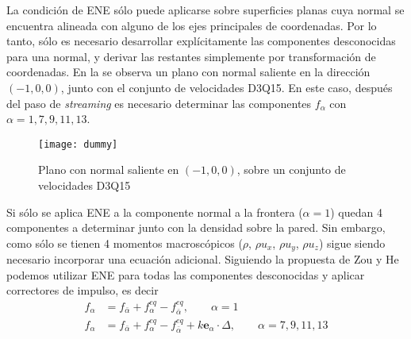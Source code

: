 La condici\'on de ENE s\'olo puede aplicarse sobre superficies planas cuya normal se encuentra alineada con alguno de los ejes principales de coordenadas. Por lo tanto, s\'olo es necesario desarrollar expl\'icitamente las componentes desconocidas para una normal, y derivar las restantes simplemente por transformaci\'on de coordenadas. En la  se observa un plano con normal saliente en la direcci\'on $(-1,0,0)$, junto con el conjunto de velocidades D3Q15. En este caso, despu\'es del paso de \emph{streaming} es necesario determinar las componentes $f_{\alpha}$ con $\alpha=1,7,9,11,13$. 
\begin{figure}[ht]
	\centering
	\texttt{[image: dummy]}
	\caption{Plano con normal saliente en $(-1,0,0)$, sobre un conjunto de velocidades D3Q15}
	\label{fig:d3q15_normal_plane}
\end{figure}

Si s\'olo se aplica ENE a la componente normal a la frontera ($\alpha=1$) quedan 4 componentes a determinar junto con la densidad sobre la pared. Sin embargo, como s\'olo se tienen 4 momentos macrosc\'opicos ($\rho$, $\rho u_x$, $\rho u_y$, $\rho u_z$) sigue siendo necesario incorporar una ecuaci\'on adicional. Siguiendo la propuesta de Zou y He \cite{zou_pressure_1997} podemos utilizar ENE para todas las componentes desconocidas y aplicar correctores de impulso, es decir 
\begin{equation}
	\begin{aligned}
		f_{\alpha} &= f_{\bar{\alpha}} + f_{\alpha}^{eq} - f_{\bar{\alpha}}^{eq}, \qquad  \alpha=1 \\
		f_{\alpha} &= f_{\bar{\alpha}} + f_{\alpha}^{eq} - f_{\bar{\alpha}}^{eq} + k \bm{e}_{\alpha} \cdot \Delta,    \qquad  \alpha=7,9,11,13
	\end{aligned}
\end{equation}

